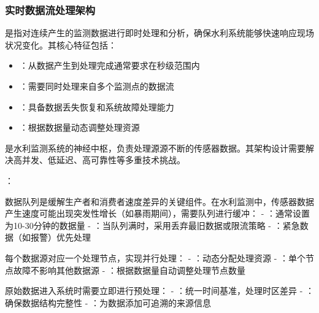 \hypertarget{ux5b9eux65f6ux6570ux636eux6d41ux5904ux7406ux67b6ux6784}{%
\subsubsection{实时数据流处理架构}\label{ux5b9eux65f6ux6570ux636eux6d41ux5904ux7406ux67b6ux6784}}

是指对连续产生的监测数据进行即时处理和分析，确保水利系统能够快速响应现场状况变化。其核心特征包括：

\begin{itemize}
\tightlist
\item
  ：从数据产生到处理完成通常要求在秒级范围内
\item
  ：需要同时处理来自多个监测点的数据流
\item
  ：具备数据丢失恢复和系统故障处理能力
\item
  ：根据数据量动态调整处理资源
\end{itemize}

是水利监测系统的神经中枢，负责处理源源不断的传感器数据。其架构设计需要解决高并发、低延迟、高可靠性等多重技术挑战。

：


数据队列是缓解生产者和消费者速度差异的关键组件。在水利监测中，传感器数据产生速度可能出现突发性增长（如暴雨期间），需要队列进行缓冲： - ：通常设置为10-30分钟的数据量 - ：当队列满时，采用丢弃最旧数据或限流策略 - ：紧急数据（如报警）优先处理


每个数据源对应一个处理节点，实现并行处理： - ：动态分配处理资源 - ：单个节点故障不影响其他数据源 - ：根据数据量自动调整处理节点数量


原始数据进入系统时需要立即进行预处理： - ：统一时间基准，处理时区差异 - ：确保数据结构完整性 - ：为数据添加可追溯的来源信息

